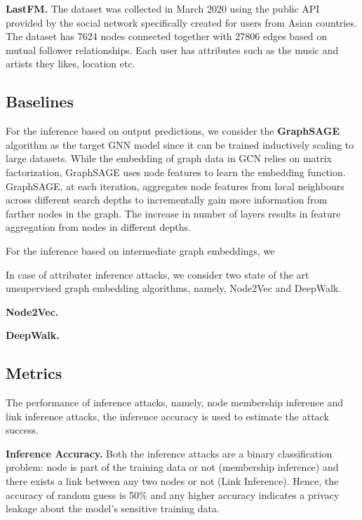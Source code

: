 \noindent\textbf{LastFM.} The dataset was collected in March 2020 using the public API provided by the social network specifically created for users from Asian countries.
The dataset has 7624 nodes connected together with 27806 edges based on mutual follower relationships.
Each user has attributes such as the music and artists they likes, location etc.


\subsection{Baselines}

For the inference based on output predictions, we consider the \textbf{GraphSAGE} algorithm as the target GNN model since it can be trained inductively scaling to large datasets.
While the embedding of graph data in GCN relies on matrix factorization, GraphSAGE uses node features to learn the embedding function.
GraphSAGE, at each iteration, aggregates node features from local neighbours across different search depths to incrementally gain more information from farther nodes in the graph.
The increase in number of layers results in feature aggregation from nodes in different depths.

For the inference based on intermediate graph embeddings, we


In case of attributer inference attacks, we consider two state of the art unsupervised graph embedding algorithms, namely, Node2Vec and DeepWalk.

\noindent\textbf{Node2Vec.}

\noindent\textbf{DeepWalk.}







\subsection{Metrics}

The performance of inference attacks, namely, node membership inference and link inference attacks, the inference accuracy is used to estimate the attack success.

\noindent\textbf{Inference Accuracy.} Both the inference attacks are a binary classification problem: node is part of the training data or not (membership inference) and there exists a link between any two nodes or not (Link Inference).
Hence, the accuracy of random guess is 50\% and any higher accuracy indicates a privacy leakage about the model's sensitive training data.

